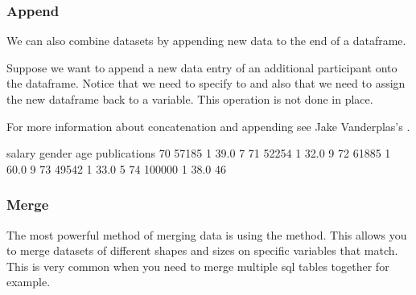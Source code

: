 \documentclass[letterpaper,10pt,english]{sphinxmanual}
\begin{document}
\subsubsection{Append}
\label{\detokenize{content/Introduction_to_Pandas:append}}
We can also combine datasets by appending new data to the end of a dataframe.

Suppose we want to append a new data entry of an additional participant onto the  dataframe. Notice that we need to specify to  and also that we need to assign the new dataframe back to a variable. This operation is not done in place.

For more information about concatenation and appending see Jake Vanderplas’s .

\begin{sphinxVerbatim}[commandchars=\\\{\}]
     
   
\end{sphinxVerbatim}

\begin{sphinxVerbatim}[commandchars=\\\{\}]
    salary  gender   age  publications
70   57185       1  39.0             7
71   52254       1  32.0             9
72   61885       1  60.0             9
73   49542       1  33.0             5
74  100000       1  38.0            46
\end{sphinxVerbatim}


\subsubsection{Merge}
\label{\detokenize{content/Introduction_to_Pandas:merge}}
The most powerful method of merging data is using the  method. This allows you to merge datasets of different shapes and sizes on specific variables that match. This is very common when you need to merge multiple sql tables together for example.
\end{document}
